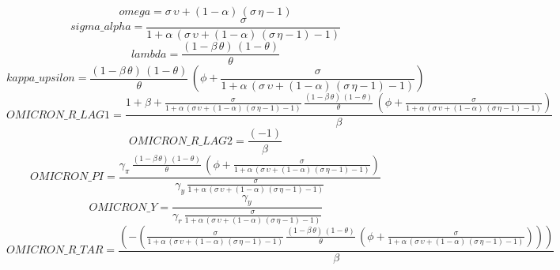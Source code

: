 \begin{dmath*}
omega = {\sigma}\, {\upsilon}+\left(1-{\alpha}\right)\, \left({\sigma}\, {\eta}-1\right)
\end{dmath*}
\begin{dmath*}
sigma\_alpha = \frac{{\sigma}}{1+{\alpha}\, \left({\sigma}\, {\upsilon}+\left(1-{\alpha}\right)\, \left({\sigma}\, {\eta}-1\right)-1\right)}
\end{dmath*}
\begin{dmath*}
lambda = \frac{\left(1-{\beta}\, {\theta}\right)\, \left(1-{\theta}\right)}{{\theta}}
\end{dmath*}
\begin{dmath*}
kappa\_upsilon = \frac{\left(1-{\beta}\, {\theta}\right)\, \left(1-{\theta}\right)}{{\theta}}\, \left({\phi}+\frac{{\sigma}}{1+{\alpha}\, \left({\sigma}\, {\upsilon}+\left(1-{\alpha}\right)\, \left({\sigma}\, {\eta}-1\right)-1\right)}\right)
\end{dmath*}
\begin{dmath*}
OMICRON\_R\_LAG1 = \frac{1+{\beta}+\frac{{\sigma}}{1+{\alpha}\, \left({\sigma}\, {\upsilon}+\left(1-{\alpha}\right)\, \left({\sigma}\, {\eta}-1\right)-1\right)}\, \frac{\left(1-{\beta}\, {\theta}\right)\, \left(1-{\theta}\right)}{{\theta}}\, \left({\phi}+\frac{{\sigma}}{1+{\alpha}\, \left({\sigma}\, {\upsilon}+\left(1-{\alpha}\right)\, \left({\sigma}\, {\eta}-1\right)-1\right)}\right)}{{\beta}}
\end{dmath*}
\begin{dmath*}
OMICRON\_R\_LAG2 = \frac{\left(-1\right)}{{\beta}}
\end{dmath*}
\begin{dmath*}
OMICRON\_PI = \frac{{\gamma_{\pi}}\, \frac{\left(1-{\beta}\, {\theta}\right)\, \left(1-{\theta}\right)}{{\theta}}\, \left({\phi}+\frac{{\sigma}}{1+{\alpha}\, \left({\sigma}\, {\upsilon}+\left(1-{\alpha}\right)\, \left({\sigma}\, {\eta}-1\right)-1\right)}\right)}{{\gamma_{y}}\, \frac{{\sigma}}{1+{\alpha}\, \left({\sigma}\, {\upsilon}+\left(1-{\alpha}\right)\, \left({\sigma}\, {\eta}-1\right)-1\right)}}
\end{dmath*}
\begin{dmath*}
OMICRON\_Y = \frac{{\gamma_{y}}}{{\gamma_{r}}\, \frac{{\sigma}}{1+{\alpha}\, \left({\sigma}\, {\upsilon}+\left(1-{\alpha}\right)\, \left({\sigma}\, {\eta}-1\right)-1\right)}}
\end{dmath*}
\begin{dmath*}
OMICRON\_R\_TAR = \frac{\left(-\left(\frac{{\sigma}}{1+{\alpha}\, \left({\sigma}\, {\upsilon}+\left(1-{\alpha}\right)\, \left({\sigma}\, {\eta}-1\right)-1\right)}\, \frac{\left(1-{\beta}\, {\theta}\right)\, \left(1-{\theta}\right)}{{\theta}}\, \left({\phi}+\frac{{\sigma}}{1+{\alpha}\, \left({\sigma}\, {\upsilon}+\left(1-{\alpha}\right)\, \left({\sigma}\, {\eta}-1\right)-1\right)}\right)\right)\right)}{{\beta}}
\end{dmath*}
